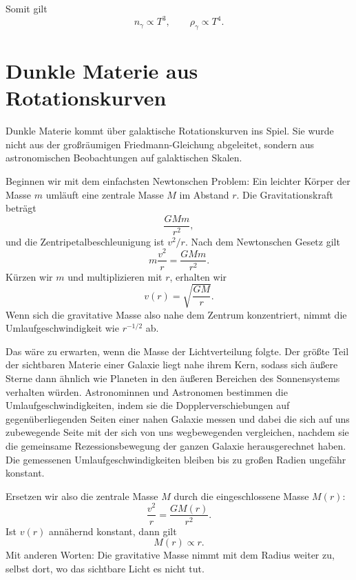Somit gilt
\begin{equation}
n_\gamma\propto T^3,
\qquad
\rho_\gamma\propto T^4.
\end{equation}

\section{Dunkle Materie aus Rotationskurven}

Dunkle Materie kommt über galaktische Rotationskurven ins Spiel. Sie wurde nicht aus der großräumigen Friedmann-Gleichung abgeleitet, sondern aus astronomischen Beobachtungen auf galaktischen Skalen.

Beginnen wir mit dem einfachsten Newtonschen Problem: Ein leichter Körper der Masse \(m\) umläuft eine zentrale Masse \(M\) im Abstand \(r\). Die Gravitationskraft beträgt
\begin{equation}
\frac{GMm}{r^2},
\end{equation}
und die Zentripetalbeschleunigung ist \(v^2/r\). Nach dem Newtonschen Gesetz gilt
\begin{equation}
m\frac{v^2}{r}=\frac{GMm}{r^2}.
\end{equation}
Kürzen wir \(m\) und multiplizieren mit \(r\), erhalten wir
\begin{equation}
v(r)=\sqrt{\frac{GM}{r}}.
\end{equation}
Wenn sich die gravitative Masse also nahe dem Zentrum konzentriert, nimmt die Umlaufgeschwindigkeit wie \(r^{-1/2}\) ab.

Das wäre zu erwarten, wenn die Masse der Lichtverteilung folgte. Der größte Teil der sichtbaren Materie einer Galaxie liegt nahe ihrem Kern, sodass sich äußere Sterne dann ähnlich wie Planeten in den äußeren Bereichen des Sonnensystems verhalten würden. Astronominnen und Astronomen bestimmen die Umlaufgeschwindigkeiten, indem sie die Dopplerverschiebungen auf gegenüberliegenden Seiten einer nahen Galaxie messen und dabei die sich auf uns zubewegende Seite mit der sich von uns wegbewegenden vergleichen, nachdem sie die gemeinsame Rezessionsbewegung der ganzen Galaxie herausgerechnet haben. Die gemessenen Umlaufgeschwindigkeiten bleiben bis zu großen Radien ungefähr konstant.

Ersetzen wir also die zentrale Masse \(M\) durch die eingeschlossene Masse \(M(r)\):
\begin{equation}
\frac{v^2}{r}=\frac{G M(r)}{r^2}.
\end{equation}
Ist \(v(r)\) annähernd konstant, dann gilt
\begin{equation}
M(r)\propto r.
\end{equation}
Mit anderen Worten: Die gravitative Masse nimmt mit dem Radius weiter zu, selbst dort, wo das sichtbare Licht es nicht tut.


